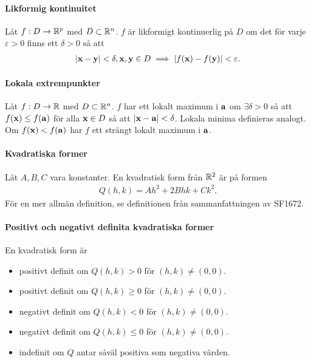 \paragraph{Likformig kontinuitet}
Låt $f: D\to\mathbb{R}^p$ med $D\subset\mathbb{R}^n$. $f$ är likformigt kontinuerlig på $D$ om det för varje $\varepsilon > 0$ finns ett $\delta > 0$ så att
\begin{align*}
	\abs{\vect{x} - \vect{y}} < \delta, \vect{x}, \vect{y}\in D \implies\abs{f(\vect{x}) - f(\vect{y})} < \varepsilon.
\end{align*}

\paragraph{Lokala extrempunkter}
Låt $f: D\to\mathbb{R}$ med $D\subset\mathbb{R}^n$. $f$ har ett lokalt maximum i $\vect{a}$ om $\exists\delta > 0$ så att $f(\vect{x})\leq f(\vect{a})$ för alla $\vect{x}\in D$ så att $\abs{\vect{x} - \vect{a}} < \delta$. Lokala minima definieras analogt. Om $f(\vect{x}) < f(\vect{a})$ har $f$ ett strängt lokalt maximum i $\vect{a}$.

\paragraph{Kvadratiska former}
Låt $A, B, C$ vara konstanter. En kvadratisk form från $\mathbb{R}^2$ är på formen
\begin{align*}
	Q(h, k) = Ah^2 + 2Bhk + Ck^2.
\end{align*}
För en mer allmän definition, se definitionen från sammanfattningen av SF1672.

\paragraph{Positivt och negativt definita kvadratiska former}
En kvadratisk form är
\begin{itemize}
	\item positivt definit om $Q(h, k) > 0$ för $(h, k)\neq (0,0)$.
	\item positivt definit om $Q(h, k)\geq 0$ för $(h, k)\neq (0,0)$.
	\item negativt definit om $Q(h, k) < 0$ för $(h, k)\neq (0,0)$.
	\item negativt definit om $Q(h, k)\leq 0$ för $(h, k)\neq (0,0)$.
	\item indefinit om $Q$ antar såväl positiva som negativa värden.
\end{itemize}

